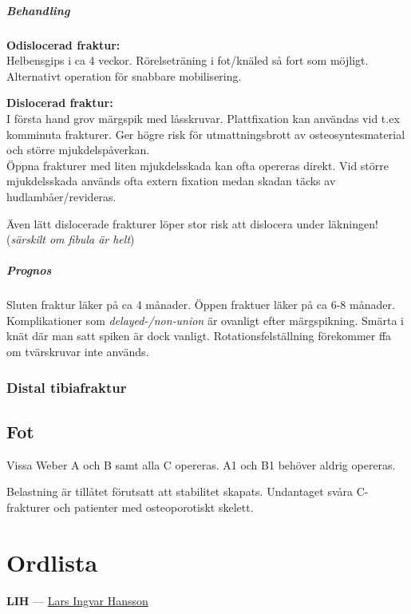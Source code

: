 \documentclass[
  letterpaper,
  DIV=11,
  numbers=noendperiod]{scrreport}
\let\oldparagraph\paragraph
\renewcommand{\paragraph}[1]{\oldparagraph{#1}\mbox{}}
\begin{document}
\hypertarget{behandling-15}{%
\paragraph{Behandling}\label{behandling-15}}

\textbf{Odislocerad fraktur:}\\
Helbensgips i ca 4 veckor. Rörelseträning i fot/knäled så fort som
möjligt. Alternativt operation för snabbare mobilisering.

\textbf{Dislocerad fraktur:}\\
I första hand grov märgspik med låsskruvar. Plattfixation kan användas
vid t.ex komminuta frakturer. Ger högre risk för utmattningsbrott av
osteosyntesmaterial och större mjukdelspåverkan.\\
Öppna frakturer med liten mjukdelsskada kan ofta opereras direkt. Vid
större mjukdelsskada används ofta extern fixation medan skadan täcks av
hudlambåer/revideras.

Även lätt dislocerade frakturer löper stor risk att dislocera under
läkningen!(\emph{särskilt om fibula är helt})

\hypertarget{prognos-13}{%
\paragraph{Prognos}\label{prognos-13}}

Sluten fraktur läker på ca 4 månader. Öppen fraktuer läker på ca 6-8
månader.\\
Komplikationer som \emph{delayed-/non-union} är ovanligt efter
märgspikning. Smärta i knät där man satt spiken är dock vanligt.
Rotationsfelställning förekommer ffa om tvärskruvar inte används.

\hypertarget{distal-tibiafraktur}{%
\subsection{Distal tibiafraktur}\label{distal-tibiafraktur}}

\hypertarget{fot}{%
\section{Fot}\label{fot}}

Vissa Weber A och B samt alla C opereras. A1 och B1 behöver aldrig
opereras.

Belastning är tillåtet förutsatt att stabilitet skapats. Undantaget
svåra C-frakturer och patienter med osteoporotiskt skelett.

\cleardoublepage
{}
{}
\appendix

\hypertarget{ordlista}{%
\chapter{Ordlista}\label{ordlista}}

\textbf{LIH} --- \href{https://orto.nu/operation.php?id=lih}{Lars Ingvar
Hansson}
\end{document}
